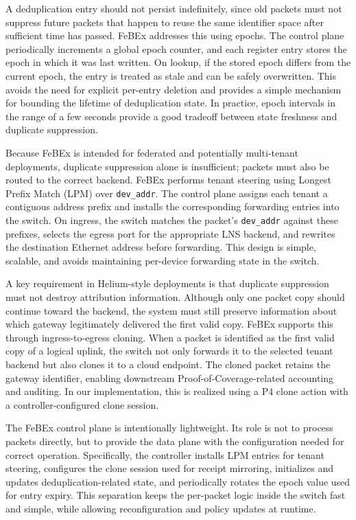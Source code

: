A deduplication entry should not persist indefinitely, since old packets must not suppress future packets that happen to reuse the same identifier space after sufficient time has passed. FeBEx addresses this using epochs. The control plane periodically increments a global epoch counter, and each register entry stores the epoch in which it was last written. On lookup, if the stored epoch differs from the current epoch, the entry is treated as stale and can be safely overwritten. This avoids the need for explicit per-entry deletion and provides a simple mechanism for bounding the lifetime of deduplication state. In practice, epoch intervals in the range of a few seconds provide a good tradeoff between state freshness and duplicate suppression.

Because FeBEx is intended for federated and potentially multi-tenant deployments, duplicate suppression alone is insufficient; packets must also be routed to the correct backend. FeBEx performs tenant steering using Longest Prefix Match (LPM) over \texttt{dev\_addr}. The control plane assigns each tenant a contiguous address prefix and installs the corresponding forwarding entries into the switch. On ingress, the switch matches the packet's \texttt{dev\_addr} against these prefixes, selects the egress port for the appropriate LNS backend, and rewrites the destination Ethernet address before forwarding. This design is simple, scalable, and avoids maintaining per-device forwarding state in the switch.

A key requirement in Helium-style deployments is that duplicate suppression must not destroy attribution information. Although only one packet copy should continue toward the backend, the system must still preserve information about which gateway legitimately delivered the first valid copy. FeBEx supports this through ingress-to-egress cloning. When a packet is identified as the first valid copy of a logical uplink, the switch not only forwards it to the selected tenant backend but also clones it to a cloud endpoint. The cloned packet retains the gateway identifier, enabling downstream Proof-of-Coverage-related accounting and auditing. In our implementation, this is realized using a P4 clone action with a controller-configured clone session.

The FeBEx control plane is intentionally lightweight. Its role is not to process packets directly, but to provide the data plane with the configuration needed for correct operation. Specifically, the controller installs LPM entries for tenant steering, configures the clone session used for receipt mirroring, initializes and updates deduplication-related state, and periodically rotates the epoch value used for entry expiry. This separation keeps the per-packet logic inside the switch fast and simple, while allowing reconfiguration and policy updates at runtime.

